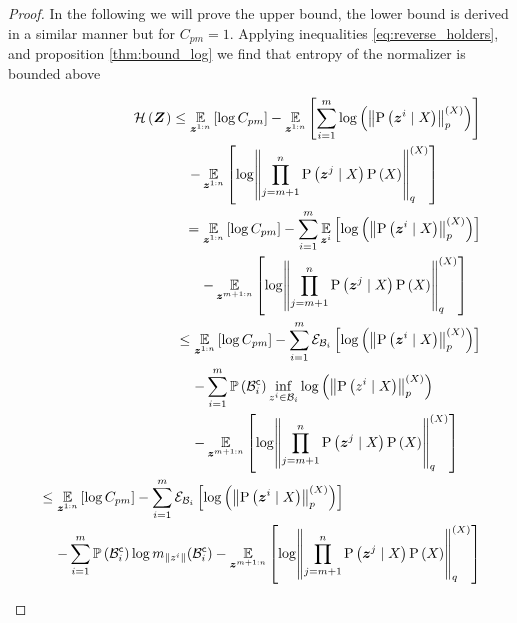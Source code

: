 \begin{proof}
	In the following we will prove the upper bound, the lower bound is derived in a similar manner but for $C_{pm}=1$. Applying inequalities \eqref{eq:reverse_holders}, and proposition \eqref{thm:bound_log} we find that entropy of the normalizer is bounded above
	\begin{small}
		\begin{align}
			\begin{split}
				\entropy{\observationsRV{}} & \leq\expectation{\log C_{pm}}{\observationRV{}{1:n}}
				-\expectation{\sum_{i=1}^{m}\log\left(\pnorm{\probcond{\observationRV{}{i}}{\states{}}}{p}{\states{}}\right)}{\observationRV{}{1:n}}\\
				&\phantomeq-\expectation{\log\pnorm{\prod_{j=m+1}^n\probcond{\observationRV{}{j}}{\states{}}\prob{\states{}}}{q}{\states{}}}{\observationRV{}{1:n}}
			\end{split}\\
			\begin{split}
				& =\expectation{\log C_{pm}}{\observationRV{}{1:n}}
				-\sum_{i=1}^{m}\expectation{\log\left(\pnorm{\probcond{\observationRV{}{i}}{\states{}}}{p}{\states{}}\right)}{\observationRV{}{i}}\\
				&\phantomeq-\expectation{\log\pnorm{\prod_{j=m+1}^n\probcond{\observationRV{}{j}}{\states{}}\prob{\states{}}}{q}{\states{}}}{\observationRV{}{m+1:n}}
			\end{split}\\
			\begin{split}
				& \leq\expectation{\log C_{pm}}{\observationRV{}{1:n}}
				-\sum_{i=1}^{m}\partialexpectation{\log\left(\pnorm{\probcond{\observationRV{}{i}}{\states{}}}{p}{\states{}}\right)}{\subSpace_i}\\
				&\phantomeq-\sum_{i=1}^{m}\measure{\stcompI{\subSpace}{i}}\inf_{\observation{}{i}\in\subSpace_i}\log\left(\pnorm{\probcond{\observation{}{i}}{\states{}}}{p}{\states{}}\right) \\
				&\phantomeq-\expectation{\log\pnorm{\prod_{j=m+1}^n\probcond{\observationRV{}{j}}{\states{}}\prob{\states{}}}{q}{\states{}}}{\observationRV{}{m+1:n}}
			\end{split} \\
			\begin{split}
				& \leq\expectation{\log C_{pm}}{\observationRV{}{1:n}}-\sum_{i=1}^{m}\partialexpectation{\log\left(\pnorm{\probcond{\observationRV{}{i}}{\states{}}}{p}{\states{}}\right)}{\subSpace_i}\\
				& \phantomeq-\sum_{i=1}^{m}\measure{\stcompI{\subSpace}{i}}\log m_{\norm{\observation{}{i}}}(\stcompI{\subSpace}{i})-\expectation{\log\pnorm{\prod_{j=m+1}^n\probcond{\observationRV{}{j}}{\states{}}\prob{\states{}}}{q}{\states{}}}{\observationRV{}{m+1:n}}

\end{split}
\end{align}
\end{small}
\end{proof}
